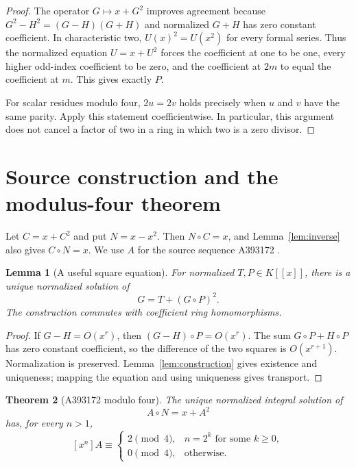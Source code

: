 \documentclass[11pt,a4paper]{article}
\newtheorem{theorem}{Theorem}[section]
\newtheorem{lemma}[theorem]{Lemma}
\theoremstyle{remark}
\begin{document}
\begin{proof}
The operator $G\mapsto x+G^2$ improves agreement because
$G^2-H^2=(G-H)(G+H)$ and normalized $G+H$ has zero constant coefficient.
In characteristic two, $U(x)^2=U(x^2)$ for every formal series. Thus the
normalized equation $U=x+U^2$ forces the coefficient at one to be one,
every higher odd-index coefficient to be zero, and the coefficient at
$2m$ to equal the coefficient at $m$. This gives exactly $P$.

For scalar residues modulo four, $2u=2v$ holds precisely when $u$ and $v$
have the same parity. Apply this statement coefficientwise. In
particular, this argument does not cancel a factor of two in a ring in
which two is a zero divisor.
\end{proof}

\section{Source construction and the modulus-four theorem}

Let $C=x+C^2$ and put $N=x-x^2$. Then $N\circ C=x$, and
Lemma~\ref{lem:inverse} also gives $C\circ N=x$. We use $A$ for the source sequence A393172 \cite{oeis172}.

\begin{lemma}[A useful square equation]\label{lem:square}
For normalized $T,P\in K[[x]]$, there is a unique normalized solution of
\[
 G=T+(G\circ P)^2.
\]
The construction commutes with coefficient ring homomorphisms.
\end{lemma}

\begin{proof}
If $G-H=O(x^r)$, then $(G-H)\circ P=O(x^r)$. The sum
$G\circ P+H\circ P$ has zero constant coefficient, so the difference
of the two squares is $O(x^{r+1})$. Normalization is preserved.
Lemma~\ref{lem:construction} gives existence and uniqueness; mapping the
equation and using uniqueness gives transport.
\end{proof}

\begin{theorem}[A393172 modulo four]\label{thm:catalanfour}
The unique normalized integral solution of
\[
 A\circ N=x+A^2 \tag{1}
\]
has, for every $n>1$,
\[
 [x^n]A\equiv
 \begin{cases}
 2\pmod4,& n=2^k\text{ for some }k\ge0,\\
 0\pmod4,& \text{otherwise}.
 \end{cases}
\]
\end{theorem}
\end{document}
